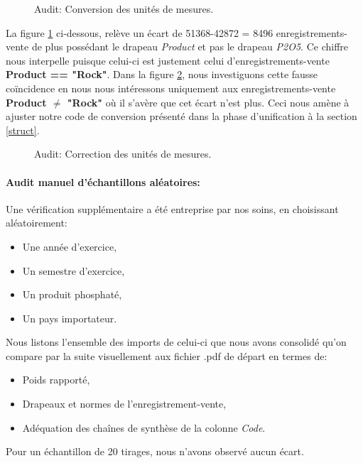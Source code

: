 		\begin{figure}[H]
		\centering
		\caption{Audit: Conversion des unités de mesures.}
		\label{fig:diffprod}
		\end{figure}
		La figure \ref{fig:diffprod} ci-dessous, relève un écart de 51368-42872 = 8496 enregistrements-vente de plus possédant le drapeau \textit{Product} et pas le drapeau \textit{P2O5}. Ce chiffre nous interpelle puisque celui-ci est justement celui d'enregistrements-vente \textbf{Product == "Rock"}. Dans la figure \ref{fig:corrprod}, nous investiguons cette fausse coïncidence en nous nous intéressons uniquement aux enregistrements-vente  \textbf{Product $\neq$ "Rock"} où il s'avère que cet écart n'est plus. Ceci nous amène à ajuster notre code de conversion présenté dans la phase d'unification à la section \ref{struct}.
		\begin{figure}[H]
		\centering
		\caption{Audit: Correction des unités de mesures.}
		\label{fig:corrprod}
		\end{figure}
	\paragraph{Audit manuel d'échantillons aléatoires:\\}
	Une vérification supplémentaire a été entreprise par nos soins, en choisissant aléatoirement:
	\begin{itemize}
	\item Une année d'exercice,
	\item Un semestre d'exercice,
	\item Un produit phosphaté,
	\item Un pays importateur.
	\end{itemize}
	Nous listons l'ensemble des imports de celui-ci que nous avons consolidé qu'on compare par la suite visuellement aux fichier .pdf de départ en termes de:
	\begin{itemize}
	\item Poids rapporté,
	\item Drapeaux et normes de l'enregistrement-vente,
	\item Adéquation des chaînes de synthèse de la colonne \textit{Code}.
	\end{itemize}
	Pour un échantillon de 20 tirages, nous n'avons observé aucun écart.
